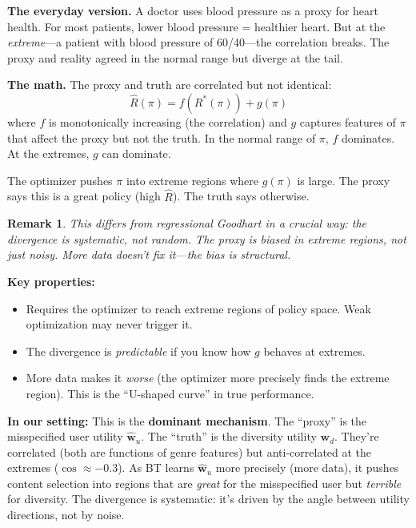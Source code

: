 \documentclass[11pt]{article}
\newtheorem{remark}{Remark}
\begin{document}
\textbf{The everyday version.} A doctor uses blood pressure as a proxy
for heart health. For most patients, lower blood pressure = healthier
heart. But at the \emph{extreme}---a patient with blood pressure of
60/40---the correlation breaks. The proxy and reality agreed in the
normal range but diverge at the tail.

\textbf{The math.} The proxy and truth are correlated but not identical:
\begin{equation}
  \hat{R}(\pi) = f(R^*(\pi)) + g(\pi)
\end{equation}
where $f$ is monotonically increasing (the correlation) and $g$ captures
features of $\pi$ that affect the proxy but not the truth. In the normal
range of $\pi$, $f$ dominates. At the extremes, $g$ can dominate.

The optimizer pushes $\pi$ into extreme regions where $g(\pi)$ is large.
The proxy says this is a great policy (high $\hat{R}$). The truth says
otherwise.

\begin{remark}
This differs from regressional Goodhart in a crucial way: the divergence
is \emph{systematic}, not random. The proxy is biased in extreme regions,
not just noisy. More data doesn't fix it---the bias is structural.
\end{remark}

\textbf{Key properties:}
\begin{itemize}
  \item Requires the optimizer to reach extreme regions of policy space.
    Weak optimization may never trigger it.
  \item The divergence is \emph{predictable} if you know how $g$
    behaves at extremes.
  \item More data makes it \emph{worse} (the optimizer more precisely
    finds the extreme region). This is the ``U-shaped curve'' in true
    performance.
\end{itemize}

\textbf{In our setting:} This is the \textbf{dominant mechanism}. The
``proxy'' is the misspecified user utility $\hat{\mathbf{w}}_u$. The
``truth'' is the diversity utility $\mathbf{w}_d$. They're correlated
(both are functions of genre features) but anti-correlated at the
extremes ($\cos \approx -0.3$). As BT learns $\hat{\mathbf{w}}_u$ more
precisely (more data), it pushes content selection into regions that are
\emph{great} for the misspecified user but \emph{terrible} for
diversity. The divergence is systematic: it's driven by the angle
between utility directions, not by noise.
\end{document}
